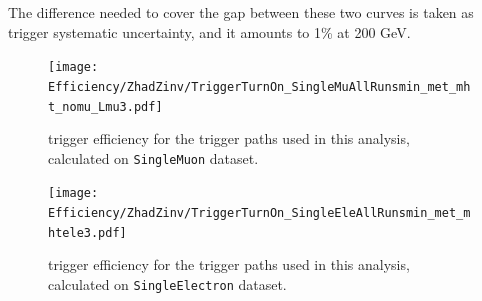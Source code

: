 The difference needed to cover the gap between these two curves is taken as trigger systematic uncertainty, and it amounts to 1\% at 200 GeV. %



 \begin{figure}[!htb]
   \begin{center}
     \texttt{[image: Efficiency/ZhadZinv/TriggerTurnOn\_SingleMuAllRunsmin\_met\_mht\_nomu\_Lmu3.pdf]}
   \end{center}
   \caption{\met trigger efficiency for the \met trigger paths used in this analysis, calculated on {\tt SingleMuon} dataset.}
   \label{fig:MetTrigMu}
 \end{figure}

 \begin{figure}[!htb]
   \begin{center}
     \texttt{[image: Efficiency/ZhadZinv/TriggerTurnOn\_SingleEleAllRunsmin\_met\_mhtele3.pdf]}
   \end{center}
   \caption{\met trigger efficiency for the \met trigger paths used in this analysis, calculated on {\tt SingleElectron} dataset.}
   \label{fig:MetTrigEle}
 \end{figure}

\clearpage

